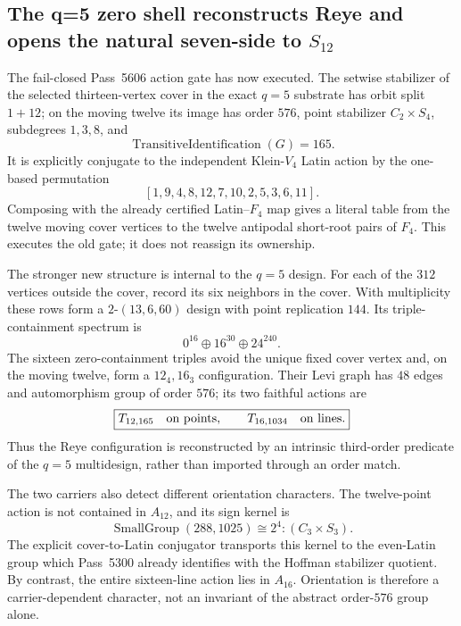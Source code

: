 \subsection{The q=5 zero shell reconstructs Reye and opens the natural seven-side to $S_{12}$}
\label{sec:pass5667-5674-q5-reye}

The fail-closed Pass~5606 action gate has now executed.  The setwise stabilizer
of the selected thirteen-vertex cover in the exact $q=5$ substrate has orbit
split $1+12$; on the moving twelve its image has order $576$, point stabilizer
$C_2\times S_4$, subdegrees $1,3,8$, and
\[
 \operatorname{TransitiveIdentification}(G)=165.
\]
It is explicitly conjugate to the independent Klein-$V_4$ Latin action by the
one-based permutation
\[
 \boxed{[1,9,4,8,12,7,10,2,5,3,6,11]}.
\]
Composing with the already certified Latin--$F_4$ map gives a literal table from
the twelve moving cover vertices to the twelve antipodal short-root pairs of
$F_4$.  This executes the old gate; it does not reassign its ownership.

The stronger new structure is internal to the $q=5$ design.  For each of the
$312$ vertices outside the cover, record its six neighbors in the cover.  With
multiplicity these rows form a $2$-$(13,6,60)$ design with point replication
$144$.  Its triple-containment spectrum is
\[
 \boxed{0^{16}\oplus16^{30}\oplus24^{240}}.
\]
The sixteen zero-containment triples avoid the unique fixed cover vertex and,
on the moving twelve, form a $12_4,16_3$ configuration.  Their Levi graph has
$48$ edges and automorphism group of order $576$; its two faithful actions are
\[
 \boxed{T_{12,165}\quad\hbox{on points},\qquad
        T_{16,1034}\quad\hbox{on lines}.}
\]
Thus the Reye configuration is reconstructed by an intrinsic third-order
predicate of the $q=5$ multidesign, rather than imported through an order match.

The two carriers also detect different orientation characters.  The twelve-point
action is not contained in $A_{12}$, and its sign kernel is
\[
 \boxed{\operatorname{SmallGroup}(288,1025)
        \cong2^4:(C_3\times S_3).}
\]
The explicit cover-to-Latin conjugator transports this kernel to the even-Latin
group which Pass~5300 already identifies with the Hoffman stabilizer quotient.
By contrast, the entire sixteen-line action lies in $A_{16}$.  Orientation is
therefore a carrier-dependent character, not an invariant of the abstract
order-$576$ group alone.

